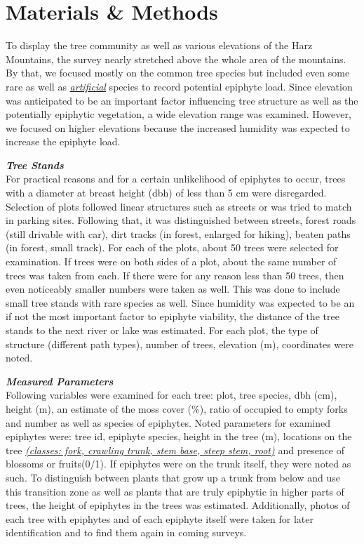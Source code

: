 \documentclass[a4paper]{article}
\newcommand{\imp}[1]{\underline{\textit{#1}}}
\begin{document}
\section{Materials \& Methods}
To display the tree community as well as various elevations of the Harz Mountains, the survey nearly stretched above the whole area of the mountains. By that, we focused mostly on the common tree species but included even some rare as well as \imp{artificial} species to record potential epiphyte load. Since elevation was anticipated to be an important factor  influencing tree structure as well as the potentially epiphytic vegetation, a wide elevation range was examined. However, we focused on higher elevations because the increased humidity was expected to increase the epiphyte load.

\textbf{\textit{Tree Stands}}\\
For practical reasons and for a certain unlikelihood of epiphytes to occur, trees with a diameter at breast height (dbh) of less than 5 cm were disregarded. Selection of plots followed linear structures such as streets or was tried to match in parking sites. Following that, it was distinguished between streets, forest roads (still drivable with car), dirt tracks (in forest, enlarged for hiking), beaten paths (in forest, small track). For each of the plots, about 50 trees were selected for examination. If trees were on both sides of a plot, about the same number of trees was taken from each. If there were for any reason less than 50 trees, then even noticeably smaller numbers were taken as well. This was done to include small tree stands with rare species as well. Since humidity was expected to be an if not the most important factor to epiphyte viability, the distance of the tree stands to the next river or lake was estimated. For each plot, the type of structure (different path types), number of trees, elevation (m), coordinates were noted.

\textbf{\textit{Measured Parameters}}\\
Following variables were examined for each tree: plot, tree species, dbh (cm), height (m), an estimate of the moss cover (\%), ratio of occupied to empty forks and number as well as species of epiphytes. Noted parameters for examined epiphytes were: tree id, epiphyte species, height in the tree (m), locations on the tree \imp{(classes: fork, crawling trunk, stem base, steep stem, root)} and presence of blossoms or fruits(0/1). If epiphytes were on the trunk itself, they were noted as such. To distinguish between plants that grow up a trunk from below and use this transition zone as well as plants that are truly epiphytic in higher parts of trees, the height of epiphytes in the trees was estimated. Additionally, photos of each tree with epiphytes and of each epiphyte itself were taken for later identification and to find them again in coming surveys.
\end{document}
